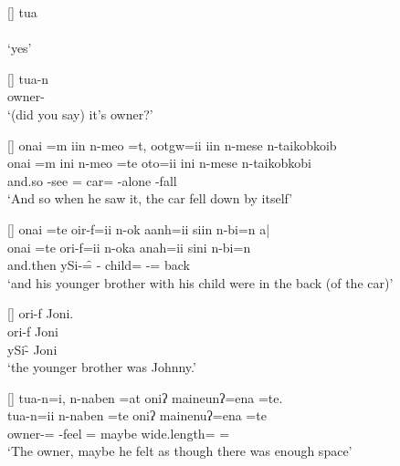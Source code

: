 \begin{exe}
\vspace{-4pt}
[]{\gll
	tua \\
	{\tua} \\
\glt `yes'}

[]{\gll
	tua-n \\
	owner-{\N} \\
\glt `(did you say) it's owner?'}

[]{\glll
	{onai =m} iin n-meo =t, ootgw=ii iin n-mese n-taikob{\tl}koib \\
	{onai =m} ini n-meo =te oto=ii ini n-mese n-taikob{\tl}kobi \\
	and.so {\iin} \n-see ={\te} car={\ii} {\iin} \n-alone \n-{\prd}fall \\
\glt `And so when he saw it, the car fell down by itself'}

\newpage
{}
[]{\glll
	{onai =te} oir-f=ii n-ok aanh=ii siin n-bi=n a| \\
	{onai =te} ori-f=ii n-oka anah=ii sini n-bi=n {\a} \\
	and.then ySi-\f={\ii} {\n-\ok} child={\ii} {\siin} \n-\bi={\einV} {\a}back \\
\glt `and his younger brother with his child were in the back (of the car)'}

[]{\glll
	ori-f Joni. \\
	ori-f Joni \\
	ySi-{\f} Joni \\
\glt `the younger brother was Johnny.' }

[]{\glll
	tua-n=i, n-naben =at oniʔ maineunʔ=ena =te. \\
	tua-n=ii n-naben =te oniʔ mainenuʔ=ena =te \\
	owner-{\N}={\ii} \n-feel ={\te} maybe wide.length={\een} ={\te} \\
\glt `The owner, maybe he felt as though there was enough space'}

\end{exe}

